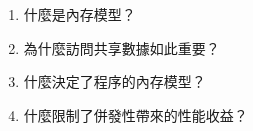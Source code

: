 \begin{enumerate}
\item 什麼是內存模型？
\item 為什麼訪問共享數據如此重要？
\item 什麼決定了程序的內存模型？
\item 什麼限制了併發性帶來的性能收益？
\end{enumerate}